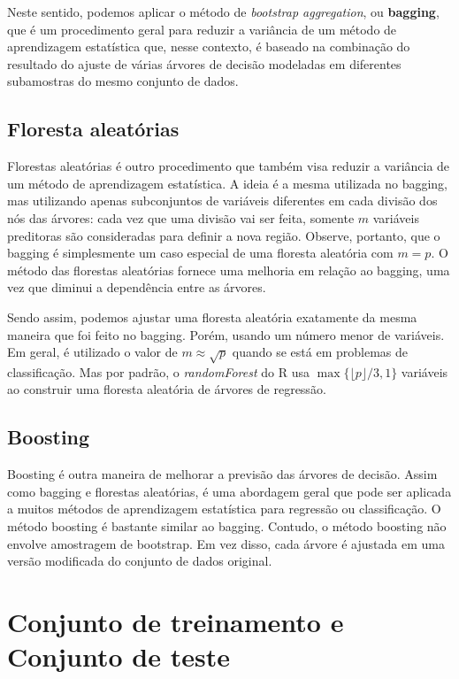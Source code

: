 \documentclass[11pt,]{article}
\begin{document}
Neste sentido, podemos aplicar o método de
\textit{bootstrap aggregation}, ou \textbf{bagging}, que é um
procedimento geral para reduzir a variância de um método de aprendizagem
estatística que, nesse contexto, é baseado na combinação do resultado do
ajuste de várias árvores de decisão modeladas em diferentes subamostras
do mesmo conjunto de dados.

\hypertarget{floresta-aleatuxf3rias}{%
\subsection{Floresta aleatórias}\label{floresta-aleatuxf3rias}}

Florestas aleatórias é outro procedimento que também visa reduzir a
variância de um método de aprendizagem estatística. A ideia é a mesma
utilizada no bagging, mas utilizando apenas subconjuntos de variáveis
diferentes em cada divisão dos nós das árvores: cada vez que uma divisão
vai ser feita, somente \(m\) variáveis preditoras são consideradas para
definir a nova região. Observe, portanto, que o bagging é simplesmente
um caso especial de uma floresta aleatória com \(m = p\). O método das
florestas aleatórias fornece uma melhoria em relação ao bagging, uma vez
que diminui a dependência entre as árvores.

Sendo assim, podemos ajustar uma floresta aleatória exatamente da mesma
maneira que foi feito no bagging. Porém, usando um número menor de
variáveis. Em geral, é utilizado o valor de \(m\approx \sqrt{p}\) quando
se está em problemas de classificação. Mas por padrão, o
\textit{randomForest} do R usa \(\max\{\lfloor p \rfloor/3,1\}\)
variáveis ao construir uma floresta aleatória de árvores de regressão.

\hypertarget{boosting}{%
\subsection{Boosting}\label{boosting}}

Boosting é outra maneira de melhorar a previsão das árvores de decisão.
Assim como bagging e florestas aleatórias, é uma abordagem geral que
pode ser aplicada a muitos métodos de aprendizagem estatística para
regressão ou classificação. O método boosting é bastante similar ao
bagging. Contudo, o método boosting não envolve amostragem de bootstrap.
Em vez disso, cada árvore é ajustada em uma versão modificada do
conjunto de dados original.

\hypertarget{conjunto-de-treinamento-e-conjunto-de-teste}{%
\section{Conjunto de treinamento e Conjunto de
teste}\label{conjunto-de-treinamento-e-conjunto-de-teste}}
\end{document}
